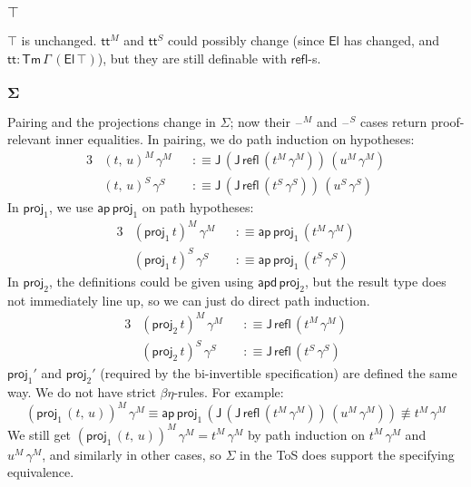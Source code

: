 \documentclass[12pt,a4paper,twoside,openany]{book}
\theoremstyle{remark}
\theoremstyle{definition}
\theoremstyle{theorem}
\newcommand{\ms}[1]{\mathsf{#1}}
\newcommand{\bs}[1]{\boldsymbol{#1}}
\newcommand{\ap}{\ms{ap}}
\newcommand{\apd}{\ms{apd}}
\newcommand{\J}{\ms{J}}
\newcommand{\refl}{\mathsf{refl}}
\newcommand{\Tm}{\mathsf{Tm}}
\newcommand{\El}{\mathsf{El}}
\newcommand{\proj}{\mathsf{proj}}
\renewcommand{\tt}{\mathsf{tt}}
\newcommand{\blank}{\mathord{\hspace{1pt}\text{--}\hspace{1pt}}}
\newcommand{\defn}{:\equiv}
\begin{document}
\subsubsection{$\bs{\top}$}

$\top$ is unchanged. $\tt^M$ and $\tt^S$ could possibly change (since $\El$ has
changed, and $\tt : \Tm\,\Gamma\,(\El\,\top)$), but they are still definable
with $\refl$-s.

\subsubsection{$\bs{\Sigma}$}

Pairing and the projections change in $\Sigma$; now their $\blank^M$ and
$\blank^S$ cases return proof-relevant inner equalities. In pairing, we do path
induction on hypotheses:
\begin{alignat*}{3}
  &(t,\,u)^M\,\gamma^M &&\defn \J\,(\J\,\refl\,(t^M\,\gamma^M))\,(u^M\,\gamma^M)\\
  &(t,\,u)^S\,\gamma^S &&\defn \J\,(\J\,\refl\,(t^S\,\gamma^S))\,(u^S\,\gamma^S)
\end{alignat*}
In $\proj_1$, we use $\ap\,\proj_1$ on path hypotheses:
\begin{alignat*}{3}
  &(\proj_1\,t)^M\,\gamma^M &&\defn \ap\,\proj_1\,(t^M\,\gamma^M)\\
  &(\proj_1\,t)^S\,\gamma^S &&\defn \ap\,\proj_1\,(t^S\,\gamma^S)
\end{alignat*}
In $\proj_2$, the definitions could be given using $\apd\,\proj_2$, but the
result type does not immediately line up, so we can just do direct path induction.
\begin{alignat*}{3}
  &(\proj_2\,t)^M\,\gamma^M &&\defn \J\,\refl\,(t^M\,\gamma^M)\\
  &(\proj_2\,t)^S\,\gamma^S &&\defn \J\,\refl\,(t^S\,\gamma^S)
\end{alignat*}
$\proj_1'$ and $\proj_2'$ (required by the bi-invertible specification) are defined
the same way. We do not have strict $\beta\eta$-rules. For example:
\[ (\proj_1\,(t,\,u))^M\,\gamma^M \equiv \ap\,\proj_1\,(\J\,(\J\,\refl\,(t^M\,\gamma^M))\,(u^M\,\gamma^M)) \not\equiv t^M\,\gamma^M \]
We still get $(\proj_1\,(t,\,u))^M\,\gamma^M = t^M\,\gamma^M$ by path induction on
$t^M\,\gamma^M$ and $u^M\,\gamma^M$, and similarly in other cases, so $\Sigma$ in the ToS
does support the specifying equivalence.
\end{document}
